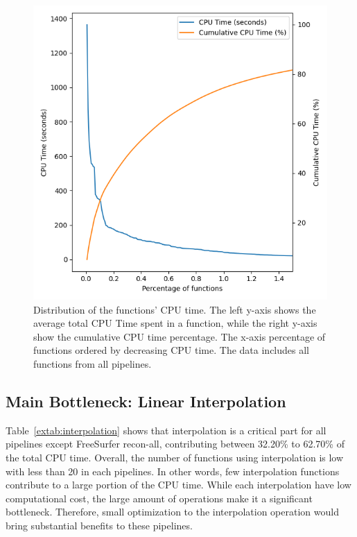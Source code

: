 \documentclass[conference]{IEEEtran}
\begin{document}
\begin{figure}[ht]
	\centering
	\includegraphics[width=\linewidth]{figures/global-longtail.png}
	\caption{Distribution of the functions' CPU time. The left y-axis shows the average total CPU Time spent in a function, while the right y-axis show the cumulative CPU time percentage. The x-axis percentage of functions ordered by decreasing CPU time. The data includes all functions from all pipelines. }
	\label{fig:long-tail-distribution}
\end{figure}

\subsection{Main Bottleneck: Linear Interpolation}
Table~\ref{extab:interpolation} shows that interpolation is a critical part for all pipelines except FreeSurfer recon-all, contributing between 32.20\% to 62.70\% of the total CPU time. Overall, the number of functions using interpolation is low with less than 20 in each pipelines. In other words, few interpolation functions contribute to a large portion of the CPU time. While each interpolation have low computational cost, the large amount of operations make it a significant bottleneck. Therefore, small optimization to the interpolation operation would bring substantial benefits to these pipelines.
\end{document}
